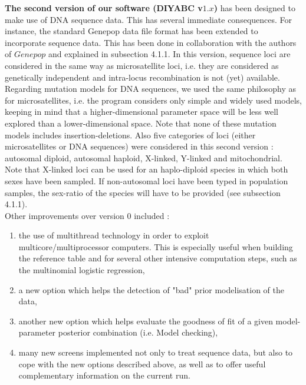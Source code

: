 \documentclass [a4paper]{report}
\begin{document}
\textbf{The second version of our software (DIYABC v$1.x$)} has been designed to make use of DNA sequence data. This has several immediate consequences. For instance, the standard Genepop data file format has been extended to incorporate sequence data. This has been done in collaboration with the authors of $Genepop$ and explained in  subsection 4.1.1. In this version, sequence loci are considered in the same way as microsatellite loci, i.e. they are considered as genetically independent and intra-locus recombination is not (yet) available. Regarding mutation models for DNA sequences, we used the same philosophy as for microsatellites, i.e. the program considers only simple and widely used models, keeping in mind that a higher-dimensional parameter space will be less well explored than a lower-dimensional space. Note that none of these mutation models includes insertion-deletions. 
Also five categories of loci (either microsatellites or DNA sequences) were considered in this second version : autosomal diploid, autosomal haploid, X-linked, Y-linked and mitochondrial. Note that X-linked loci can be used for an haplo-diploid species in which both sexes have been sampled. If non-autosomal loci have been typed in population samples, the sex-ratio of the species will have to be provided (see subsection 4.1.1).\\ 



Other improvements over version 0 included :
\begin{enumerate}
\item the use of multithread technology in order to exploit multicore/multiprocessor computers. This is especially useful when building the reference table and for several other intensive computation steps, such as the multinomial logistic regression,
\item a new option which helps the detection of "bad" prior modelisation of the data, 
\item another new option which helps evaluate the goodness of fit of a given model-parameter posterior combination (i.e. Model checking),   
\item many new screens implemented not only to treat sequence data, but also to cope with the new options described above, as well as to offer useful complementary information on the current run. 

\end{enumerate}
\end{document}
